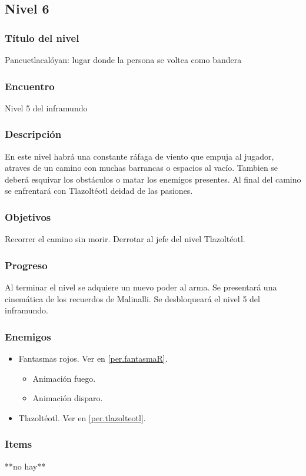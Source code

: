 \documentclass[11pt,letterpaper]{article}
\begin{document}
	
		\subsection{Nivel 6}
	\subsubsection{Título del nivel}
	Pancuetlacalóyan: lugar donde la persona se voltea como bandera
	\subsubsection{Encuentro}
	Nivel 5 del inframundo
	\subsubsection{Descripción}
	En este nivel habrá una constante ráfaga de viento que empuja al jugador, atraves de un camino con muchas barrancas o espacios al vacío. Tambien se deberá esquivar los obstáculos o matar los enemigos presentes. Al final del camino se enfrentará con Tlazoltéotl deidad de las pasiones.
	\subsubsection{Objetivos}
	Recorrer el camino sin morir. Derrotar al jefe del nivel Tlazoltéotl.
	\subsubsection{Progreso}
	Al terminar el nivel se adquiere un nuevo poder al arma. Se presentará una cinemática de los recuerdos de Malinalli. Se desbloqueará el nivel 5 del inframundo.
	\subsubsection{Enemigos}
	\begin{itemize}
		\item Fantasmas rojos. Ver en \ref{per.fantasmaR}.
			\begin{itemize}
				\item Animación fuego.
				\item Animación disparo.
			\end{itemize}
		\item Tlazoltéotl. Ver en \ref{per.tlazolteotl}.
	\end{itemize}
	\subsubsection{Items}
	**no hay**
\end{document}
